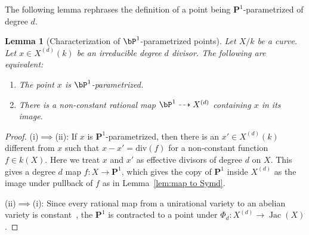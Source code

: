 \documentclass[11pt,reqno]{amsart}
\theoremstyle{plain}
\newtheorem{lemma}[theorem]{Lemma}
\theoremstyle{definition}
\newcommand{\PP}{\mathbf P}
\newcommand{\Jac}{\operatorname{Jac}}
\begin{document}
The following lemma rephrases the definition of a point being $\PP^1$-parametrized of degree $d$. 
\begin{lemma}[Characterization of $\bP^1$-parametrized points] \label{lem:iso1}
Let $X/k$ be a curve. Let $x \in X^{(d)}(k)$ be an irreducible degree $d$ divisor. The following are equivalent:
\begin{enumerate}
    \item The point $x$ is $\bP^1$-parametrized.

    \item There is a non-constant rational map $\bP^1 \dashrightarrow X^{(d)}$ containing $x$ in its image.
\end{enumerate}
\end{lemma}
\begin{proof}
(i)$\implies$(ii): If $x$ is $\PP^1$-parametrized, then there is an $x' \in X^{(d)}(k)$ different from $x$ such that 
$x-x'=\mathrm{div}(f)$ for a non-constant function $f\in k(X)$. Here we treat $x$ and $x'$ as effective divisors of degree $d$ on $X$. This gives a degree $d$ map $f\colon X \to \PP^1$, which gives the copy of $\PP^1$ inside $X^{(d)}$ as the image under pullback of $f$ as in Lemma~\ref{lem:map to Symd}.  

(ii)$\implies$(i): 
Since every rational map from a unirational variety to an abelian variety is constant~\cite[Corollary~3.9]{MilneAV}, the $\PP^1$ is contracted to a point under $\Phi_d\colon X^{(d)} \rightarrow \Jac(X)$.
\end{proof}
\end{document}
